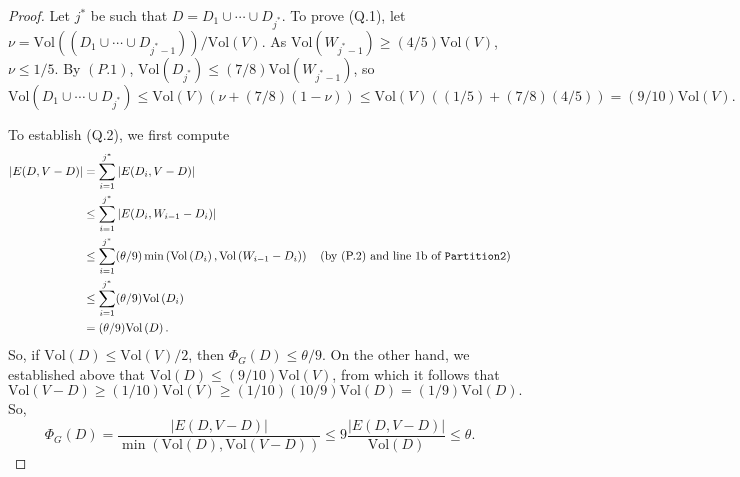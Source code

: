 \documentclass[11pt]{article}
\newcommand{\partitiontwo}{\ensuremath{\mathtt{Partition2}}}
\def\union{\cup}
\def\sizeof#1{\left|#1  \right|}
\def\vol#1{\mathrm{Vol}\left(#1  \right)}
\def\conduc#1#2{\Phi_{#1}\left(#2  \right)}
\begin{document}
\begin{proof}
Let $j^{*}$ be such that $D = D_{1} \union \dotsb \union D_{j^{*}}$.
To prove (Q.1),
  let $\nu = \vol{(D_{1} \union \dotsb \union D_{j^{*}-1})}/\vol{V}$.
As $\vol{W_{j^{*}-1}} \geq (4/5) \vol{V}$, $\nu \leq 1/5$.
By $(P.1)$,
  $\vol{D_{j^{*}}} \leq  (7/8) \vol{W_{j^{*}-1}}$, so
\[
\vol{D_{1} \union \dotsb \union D_{j^{*}}}
\leq \vol{V} (\nu + (7/8) (1-\nu))
\leq \vol{V} ((1/5) + (7/8) (4/5))
  = (9/10) \vol{V}.
\]

To establish (Q.2),
  we first compute
\begin{align*}
\sizeof{E (D, V-D)}
& =
\sum_{i=1}^{j^{*}} \sizeof{E (D_{i}, V-D)}\\
& \leq
\sum_{i=1}^{j^{*}}
  \sizeof{E (D_{i}, W_{i-1} - D_{i})}\\
& \leq
\sum_{i=1}^{j^{*}}
  (\theta /9) \min \left(\vol{D_{i}}, \vol{W_{i-1} - D_{i}} \right)
\quad
\text{(by (P.2) and line 1b of \partitiontwo  )}\\
& \leq
\sum_{i=1}^{j^{*}}
  (\theta/9)  \vol{D_{i}}
\\
& = (\theta/9)  \vol{D}.
\end{align*}
So, if  $\vol{D} \leq \vol{V}/2$,
  then $ \conduc{G}{D} \leq \theta/9$.
On the other hand, we established above that
  $\vol{D} \leq (9/10) \vol{V}$, from which
  it follows that
\[
  \vol{V-D} \geq (1/10) \vol{V} \geq (1/10) (10/9) \vol{D} = (1/9) \vol{D}.
\]
So,
\[
  \conduc{G}{D}
=
 \frac{\sizeof{E (D, V-D)}}
      {\min \left(\vol{D}, \vol{V-D} \right)}
\leq
9  \frac{\sizeof{E (D, V-D)}}{\vol{D}}
\leq
 \theta.
\]


\end{proof}
\end{document}
